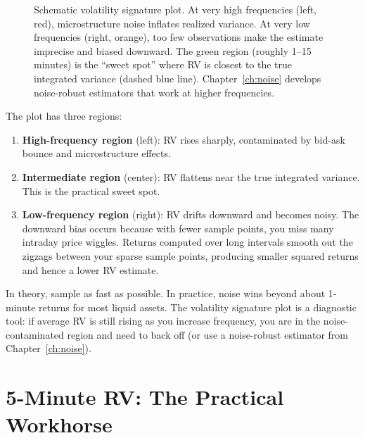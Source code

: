\begin{figure}[htbp]
\caption{Schematic volatility signature plot.
At very high frequencies (left, red), microstructure noise inflates realized variance.
At very low frequencies (right, orange), too few observations make the estimate imprecise and biased downward.
The green region (roughly 1--15 minutes) is the ``sweet spot'' where RV is closest to the true integrated variance (dashed blue line).
Chapter~\ref{ch:noise} develops noise-robust estimators that work at higher frequencies.}
\label{fig:vol-sig-plot}
\end{figure}

The plot has three regions:
\begin{enumerate}[nosep]
  \item \textbf{High-frequency region} (left): RV rises sharply, contaminated by bid-ask bounce and microstructure effects.
  \item \textbf{Intermediate region} (center): RV flattens near the true integrated variance. This is the practical sweet spot.
  \item \textbf{Low-frequency region} (right): RV drifts downward and becomes noisy. The downward bias occurs because with fewer sample points, you miss many intraday price wiggles. Returns computed over long intervals smooth out the zigzags between your sparse sample points, producing smaller squared returns and hence a lower RV estimate.
\end{enumerate}

\begin{keyidea}
In theory, sample as fast as possible.
In practice, noise wins beyond about 1-minute returns for most liquid assets.
The volatility signature plot is a diagnostic tool: if average RV is still rising as you increase frequency, you are in the noise-contaminated region and need to back off (or use a noise-robust estimator from Chapter~\ref{ch:noise}).
\end{keyidea}

\section{5-Minute RV: The Practical Workhorse}
\label{sec:five-minute-rv}

